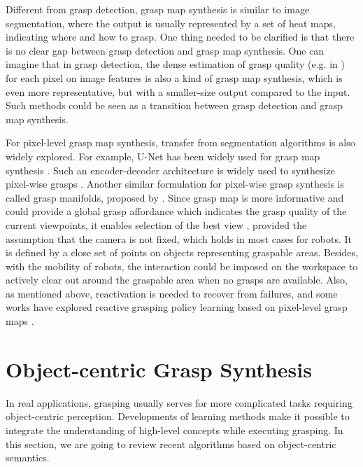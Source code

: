 \documentclass[letterpaper,10pt]{article}
\begin{document}
Different from grasp detection, grasp map synthesis is similar to image segmentation, where the output is usually represented by a set of heat maps, indicating where and how to grasp.
One thing needed to be clarified is that there is no clear gap between grasp detection and grasp map synthesis.
One can imagine that in grasp detection, the dense estimation of grasp quality (e.g. in \cite{chu2018real, zhang2019real, zhao2021regnet}) for each pixel on image features is also a kind of grasp map synthesis, which is even more representative, but with a smaller-size output compared to the input.
Such methods could be seen as a transition between grasp detection and grasp map synthesis.

For pixel-level grasp map synthesis, transfer from segmentation algorithms is also widely explored.
For example, U-Net \cite{ronneberger2015u} has been widely used for grasp map synthesis \cite{liu2019active, shao2019combining, shao2019suction, chalvatzaki2020orientation}.
Such an encoder-decoder architecture is widely used to synthesize pixel-wise grasps \cite{asif2019densely, kasaei2021mvgrasp, cao2021suctionnet, wang2021graspness, xu2021gknet}.
Another similar formulation for pixel-wise grasp synthesis is called grasp manifolds, proposed by \cite{hager2021graspme}.
Since grasp map is more informative and could provide a global grasp affordance which indicates the grasp quality of the current viewpoints, it enables selection of the best view \cite{kasaei2021mvgrasp, wang2021graspness}, provided the assumption that the camera is not fixed, which holds in most cases for robots.
It is defined by a close set of points on objects representing graspable areas.
Besides, with the mobility of robots, the interaction could be imposed on the workspace to actively clear out around the graspable area \cite{zeng2018learning, deng2019deep, liu2019active} when no grasps are available.
Also, as mentioned above, reactivation is needed to recover from failures, and some works have explored reactive grasping policy learning based on pixel-level grasp maps \cite{morrison2018closing, morrison2019multi, morrison2020learning}.

\section{Object-centric Grasp Synthesis}
\label{sec:semantic-grasp}

In real applications, grasping usually serves for more complicated tasks requiring object-centric perception. 
Developments of learning methods make it possible to integrate the understanding of high-level concepts while executing grasping. 
In this section, we are going to review recent algorithms based on object-centric semantics.
\end{document}
